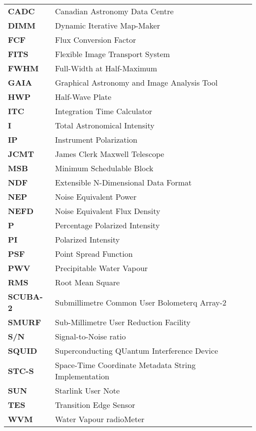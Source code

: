 \documentclass[11pt,oneside,chapters]{starlink}
\begin{document}
\scfrontmatter

\newcommand{\xparam}[2]{\hyperref[#1]{\param{#2}}}
\newcommand{\setparam}[3]{\xparam{#1}{#2}\param{~=~#3}}

\newcommand{\jsageneric}{\htmladdnormallink{\file{dimmconfig\_jsa\_generic}}
{https://raw.githubusercontent.com/Starlink/starlink/master/applications/smurf/examples/dimmconfig_jsa_generic.lis}}



\Acronyms

\begin{table}[h!]
\begin{tabular}{ll}
\textbf{CADC}   & Canadian Astronomy Data Centre\\
\textbf{DIMM}   & Dynamic Iterative Map-Maker\\
\textbf{FCF}    & Flux Conversion Factor\\
\textbf{FITS}   & Flexible Image Transport System\\
\textbf{FWHM}   & Full-Width at Half-Maximum\\
\textbf{GAIA}   & Graphical Astronomy and Image Analysis Tool\\
\textbf{HWP}    & Half-Wave Plate\\
\textbf{ITC}    & Integration Time Calculator\\
\textbf{I}      & Total Astronomical Intensity \\
\textbf{IP}     & Instrument Polarization \\
\textbf{JCMT}   & James Clerk Maxwell Telescope\\
\textbf{MSB}    & Minimum Schedulable Block\\
\textbf{NDF}    & Extensible N-Dimensional Data Format\\
\textbf{NEP}    & Noise Equivalent Power\\
\textbf{NEFD}   & Noise Equivalent Flux Density\\
\textbf{P}      & Percentage Polarized Intensity \\
\textbf{PI}     & Polarized Intensity \\
\textbf{PSF}    & Point Spread Function\\
\textbf{PWV}    & Precipitable Water Vapour\\
\textbf{RMS}    & Root Mean Square\\
\textbf{SCUBA-2}& Submillimetre Common User Bolometerq Array-2\\
\textbf{SMURF}  & Sub-Millimetre User Reduction Facility\\
\textbf{S/N}    & Signal-to-Noise ratio\\
\textbf{SQUID}  & Superconducting QUantum Interference Device\\
\textbf{STC-S}  & Space-Time Coordinate Metadata String Implementation\\
\textbf{SUN}    & Starlink User Note\\
\textbf{TES}    & Transition Edge Sensor\\
\textbf{WVM}    & Water Vapour radioMeter\\
\end{tabular}
\end{table}
\end{document}
